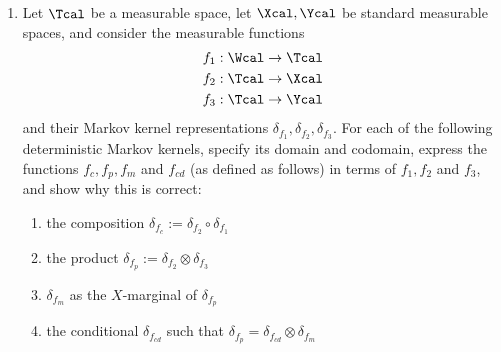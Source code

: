 \begin{enumerate}
  \item
  Let $\Tcal$ be a measurable space, let $\Xcal, \Ycal$ be standard measurable spaces, and consider the measurable functions
  \begin{align*}
    f_1 & : \Wcal \rightarrow \Tcal \\
    f_2 & : \Tcal \rightarrow \Xcal \\
    f_3 & : \Tcal \rightarrow \Ycal
  \end{align*}
  and their Markov kernel representations $\delta_{f_1}, \delta_{f_2}, \delta_{f_3}$. For each of the following deterministic Markov kernels, specify its domain and codomain, express the functions $f_c, f_p, f_m$ and $f_{cd}$ (as defined as follows) in terms of $f_1, f_2$ and $f_3$, and show why this is correct:

  \begin{enumerate}
    \item the composition $\delta_{f_c} := \delta_{f_2} \circ \delta_{f_1}$
    \item the product $\delta_{f_p} := \delta_{f_2} \otimes \delta_{f_3}$
    \item $\delta_{f_m}$ as the $X$-marginal of $\delta_{f_p}$
    \item the conditional $\delta_{f_{cd}}$ such that $\delta_{f_p} = \delta_{f_{cd}} \otimes \delta_{f_m}$
  \end{enumerate}


\end{enumerate}
